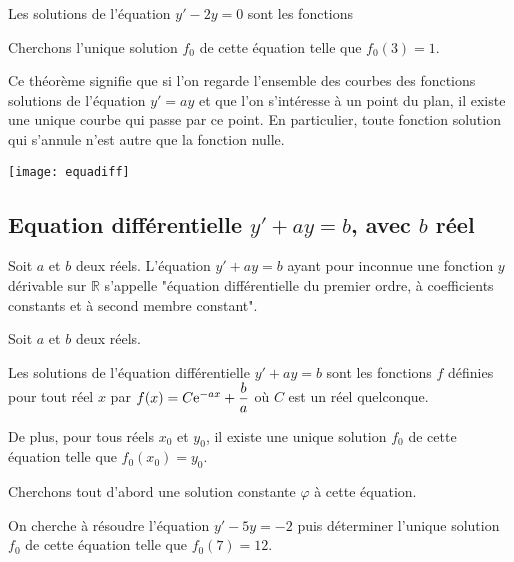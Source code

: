 \documentclass[11pt,fleqn, openany]{book} %
\begin{document}
\begin{example} Les solutions de l'équation $y'-2y=0$ sont les fonctions 

Cherchons l'unique solution $f_0$ de cette équation telle que $f_0(3)=1$. 

\vskip60pt

\end{example}

Ce théorème signifie que si l'on regarde l'ensemble des courbes des fonctions solutions de l'équation $y'=ay$ et que l'on s'intéresse à un point du plan, il existe une unique courbe qui passe par ce point. En particulier, toute fonction solution qui s'annule n'est autre que la fonction nulle.

\begin{center}
\texttt{[image: equadiff]}
\end{center}

\subsection{Equation différentielle $y'+ay=b$, avec $b$ réel}

\begin{definition} Soit $a$ et $b$ deux réels. L'équation $y'+ay=b$ ayant pour inconnue une fonction $y$ dérivable sur $\mathbb{R}$ s'appelle  "équation différentielle du premier ordre, à coefficients constants et à second membre constant".\end{definition}

\begin{proposition}Soit $a$ et $b$ deux réels.

Les solutions de l'équation différentielle $y'+ay=b$ sont les fonctions $f$ définies pour tout réel $x$ par $f(x)=C\mathrm{e}^{-ax}+\dfrac{b}{a}$ où $C$ est un réel quelconque.

De plus, pour tous réels $x_0$ et $y_0$, il existe une unique solution $f_0$ de cette équation telle que $f_0(x_0)=y_0$.\end{proposition}

\begin{demonstration} Cherchons tout d'abord une solution constante $\varphi$ à cette équation.\vskip200pt

\end{demonstration}



\begin{example} On cherche à résoudre l'équation $y'-5y=-2$ puis déterminer l'unique solution $f_0$ de cette équation telle que $f_0(7)=12$. 

\vskip150pt
\end{example}
\end{document}
